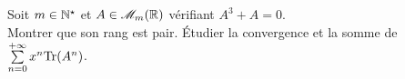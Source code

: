 \begin{exercice}
    Soit $m \in \mathbb{N}^\star$ et $A \in \mathscr{M}_m(\mathbb{R})$ vérifiant $A^3 + A = 0$.\\
    Montrer que son rang est pair. Étudier la convergence et la somme de $\sum\limits_{n=0}^{+\infty} x^n \mathrm{Tr} (A^n)$.
\end{exercice}

